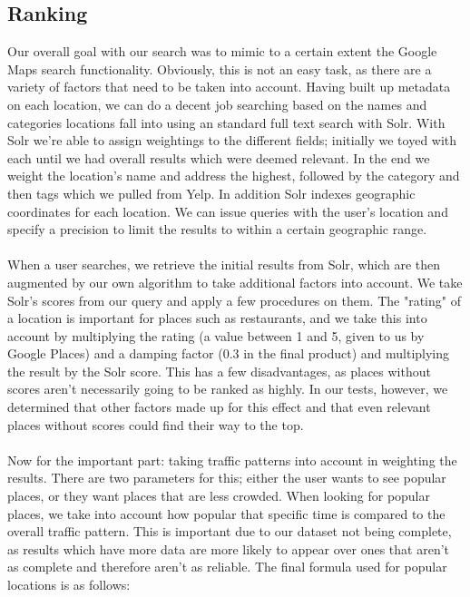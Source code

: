\documentclass{article}
\begin{document}
\subsection{Ranking}
Our overall goal with our search was to mimic to a certain extent the Google Maps search functionality. Obviously, this is not an easy task, as there are a variety of factors that need to be taken into account. Having built up metadata on each location, we can do a decent job searching based on the names and categories locations fall into using an standard full text search with Solr. With Solr we're able to assign weightings to the different fields; initially we toyed with each until we had overall results which were deemed relevant. In the end we weight the location's name and address the highest, followed by the category and then tags which we pulled from Yelp. In addition Solr indexes geographic coordinates for each location. We can issue queries with the user's location and specify a precision to limit the results to within a certain geographic range.
\\ \\
When a user searches, we retrieve the initial results from Solr, which are then augmented by our own algorithm to take additional factors into account. We take Solr's scores from our query and apply a few procedures on them. The "rating" of a location is important for places such as restaurants, and we take this into account by multiplying the rating (a value between 1 and 5, given to us by Google Places) and a damping factor (0.3 in the final product) and multiplying the result by the Solr score. This has a few disadvantages, as places without scores aren't necessarily going to be ranked as highly. In our tests, however, we determined that other factors made up for this effect and that even relevant places without scores could find their way to the top.
\\ \\
Now for the important part: taking traffic patterns into account in weighting the results. There are two parameters for this; either the user wants to see popular places, or they want places that are less crowded. When looking for popular places, we take into account how popular that specific time is compared to the overall traffic pattern. This is important due to our dataset not being complete, as results which have more data are more likely to appear over ones that aren't as complete and therefore aren't as reliable. The final formula used for popular locations is as follows:
\\ \\
\end{document}

